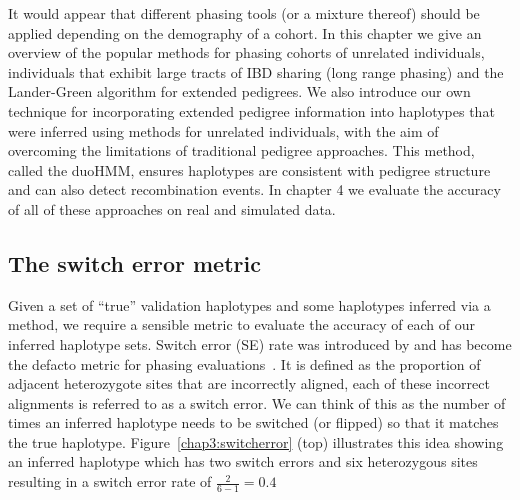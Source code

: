 It would appear that different phasing tools (or a mixture thereof) should be applied depending on the demography of a cohort. In this chapter we give an overview of the popular methods for phasing cohorts of unrelated individuals, individuals that exhibit large tracts of IBD sharing (long range phasing) and the Lander-Green algorithm for extended pedigrees.  We also introduce our own technique for incorporating extended pedigree information into haplotypes that were inferred using methods for unrelated individuals, with the aim of overcoming the limitations of traditional pedigree approaches.  This method, called the duoHMM, ensures haplotypes are consistent with pedigree structure and can also detect recombination events. In chapter 4 we evaluate the accuracy of all of these approaches on real and simulated data. 

\subsection{The switch error metric}
Given a set of ``true'' validation haplotypes and some haplotypes inferred via a method, we require a sensible metric to evaluate the accuracy of each of our inferred haplotype sets.  Switch error (SE) rate was introduced by \cite{Lin:2002hh}  and has become the defacto metric for phasing evaluations~\citep{stephens2003comparison}.  It is defined as the proportion of adjacent heterozygote sites that are incorrectly aligned, each of these incorrect alignments is referred to as a switch error. We can think of this as the number of times an inferred haplotype needs to be switched (or flipped) so that it matches the true haplotype.  Figure~\ref{chap3:switcherror} (top) illustrates this idea showing an inferred haplotype which has two switch errors and six heterozygous sites resulting in a switch error rate of $\frac{2}{6-1}=0.4$

